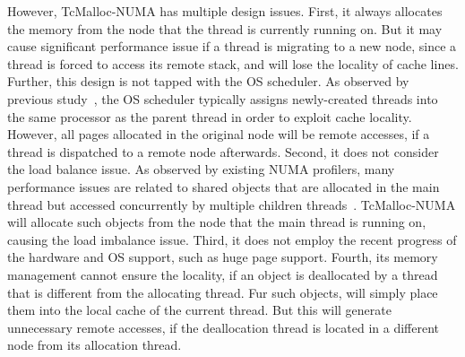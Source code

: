 However, TcMalloc-NUMA has multiple design issues. First, it always allocates the memory from the node that the thread is currently running on. But it may cause significant performance issue if a thread is migrating to a new node, since a thread is forced to access its remote stack, and will lose the locality of cache lines. Further, this design is not tapped with the OS scheduler. As observed by previous study~\cite{Grace}, the OS scheduler typically assigns newly-created threads into the same processor as the parent thread in order to exploit cache locality. However, all pages allocated in the original node will be remote accesses, if a thread is dispatched to a remote node afterwards.  Second, it does not consider the load balance issue. As observed by existing NUMA profilers, many performance issues are related to shared objects that are allocated in the main thread but accessed concurrently by multiple children threads~\cite{XULIU, MemProf}. TcMalloc-NUMA will allocate such objects from the node that the main thread is running on, causing the load imbalance issue. Third, it does not employ the recent progress of the hardware and OS support, such as huge page support. Fourth, its memory management cannot ensure the locality, if an object is deallocated by a thread that is different from the allocating thread. Fur such objects, \TN{} will simply place them into the local cache of the current thread. But this will generate unnecessary remote accesses, if the deallocation thread is located in a different node from its allocation thread.  


\begin{comment}

It first assumes that a memory block is belong to the same node for its allocating thread. However, this assumption is invalid, and is also contradict with the first-touch policy of the OS. 

If there is no such assumption, we will expect that the OS will provide an efficient API to query the locality of a page. However, no such APIs exist in both Linux and Windows. 

It checks the physical memory usage to determine the future allocations of the same node or the re-use of a remote node. But that is very slow by checking meminfo. 

In the end, it utilizes the mbind to bind the memory to a node specifically. 
	
\end{comment}
	 


